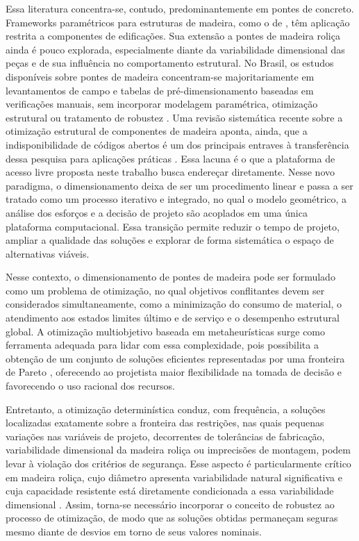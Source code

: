 Essa literatura concentra-se, contudo, predominantemente em pontes de concreto.
Frameworks paramétricos para estruturas de madeira, como o de \textcite{Jiang2023}, têm aplicação restrita a componentes de edificações.
Sua extensão a pontes de madeira roliça ainda é pouco explorada, especialmente diante da variabilidade dimensional das peças e de sua influência no comportamento estrutural.
No Brasil, os estudos disponíveis sobre pontes de madeira concentram-se majoritariamente em levantamentos de campo e tabelas de pré-dimensionamento baseadas em verificações manuais, sem incorporar modelagem paramétrica, otimização estrutural ou tratamento de robustez \parencite{Criado2024}.
Uma revisão sistemática recente sobre a otimização estrutural de componentes de madeira aponta, ainda, que a indisponibilidade de códigos abertos é um dos principais entraves à transferência dessa pesquisa para aplicações práticas \parencite{Belz2025}.
Essa lacuna é o que a plataforma de acesso livre proposta neste trabalho busca endereçar diretamente.
Nesse novo paradigma, o dimensionamento deixa de ser um procedimento linear e passa a ser tratado como um processo iterativo e integrado, no qual o modelo geométrico, a análise dos esforços e a decisão de projeto são acoplados em uma única plataforma computacional.
Essa transição permite reduzir o tempo de projeto, ampliar a qualidade das soluções e explorar de forma sistemática o espaço de alternativas viáveis.

Nesse contexto, o dimensionamento de pontes de madeira pode ser formulado como um problema de otimização, no qual objetivos conflitantes devem ser considerados simultaneamente, como a minimização do consumo de material, o atendimento aos estados limites último e de serviço e o desempenho estrutural global.
A otimização multiobjetivo baseada em metaheurísticas surge como ferramenta adequada para lidar com essa complexidade, pois possibilita a obtenção de um conjunto de soluções eficientes representadas por uma fronteira de Pareto \parencite{DEB2009}, oferecendo ao projetista maior flexibilidade na tomada de decisão e favorecendo o uso racional dos recursos.

Entretanto, a otimização determinística conduz, com frequência, a soluções localizadas exatamente sobre a fronteira das restrições, nas quais pequenas variações nas variáveis de projeto, decorrentes de tolerâncias de fabricação, variabilidade dimensional da madeira roliça ou imprecisões de montagem, podem levar à violação dos critérios de segurança.
Esse aspecto é particularmente crítico em madeira roliça, cujo diâmetro apresenta variabilidade natural significativa e cuja capacidade resistente está diretamente condicionada a essa variabilidade dimensional \parencite{Morgado2017}.
Assim, torna-se necessário incorporar o conceito de robustez ao processo de otimização, de modo que as soluções obtidas permaneçam seguras mesmo diante de desvios em torno de seus valores nominais.

